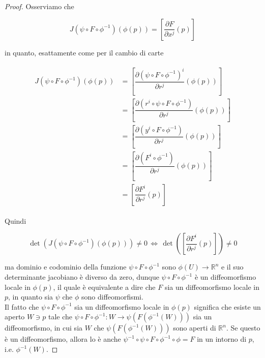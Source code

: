 \begin{proof}
	Osserviamo che
	
	\begin{equation}
		J(\psi \circ F \circ \phi^{-1})(\phi(p)) = \left[ \dfrac{\partial F}{\partial x^{j}} (p) \right]
	\end{equation}

	in quanto, esattamente come per il cambio di carte
	
	\begin{align}
		\begin{split}
			J(\psi \circ F \circ \phi^{-1})(\phi(p)) &= \left[ \dfrac{\partial (\psi \circ F \circ \phi^{-1})^{i}}{\partial r^{j}} (\phi(p)) \right]\\
			&= \left[ \dfrac{\partial (r^{i} \circ \psi \circ F \circ \phi^{-1})}{\partial r^{j}} (\phi(p)) \right]\\
			&= \left[ \dfrac{\partial (y^{i} \circ F \circ \phi^{-1})}{\partial r^{j}} (\phi(p)) \right]\\
			&= \left[ \dfrac{\partial (F^{i} \circ \phi^{-1})}{\partial r^{j}} (\phi(p)) \right]\\
			&= \left[ \dfrac{\partial F^{i}}{\partial r^{j}} (p) \right]
		\end{split}
	\end{align}

	Quindi
	
	\begin{equation}
		\det( J(\psi \circ F \circ \phi^{-1})(\phi(p)) ) \neq 0 \, \iff \, \det( \left[ \dfrac{\partial F^{i}}{\partial r^{j}} (p) \right] ) \neq 0
	\end{equation}

	ma dominio e codominio della funzione $ \psi \circ F \circ \phi^{-1} $ sono $ \phi(U) \to \mathbb{R}^{n} $ e il suo determinante jacobiano è diverso da zero, dunque $ \psi \circ F \circ \phi^{-1} $ è un diffeomorfismo locale in $ \phi(p) $, il quale è equivalente a dire che $ F $ sia un diffeomorfismo locale in $ p $, in quanto sia $ \psi $ che $ \phi $ sono diffeomorfismi.\\
	Il fatto che $ \psi \circ F \circ \phi^{-1} $ sia un diffeomorfismo locale in $ \phi(p) $ significa che esiste un aperto $ W \ni p $ tale che $ \psi \circ F \circ \phi^{-1} : W \to \psi(F(\phi^{-1}(W))) $ sia un diffeomorfismo, in cui sia $ W $ che $ \psi(F(\phi^{-1}(W))) $ sono aperti di $ \mathbb{R}^{n} $. Se questo è un diffeomorfismo, allora lo è anche $ \psi^{-1} \circ \psi \circ F \circ \phi^{-1} \circ \phi = F $ in un intorno di $ p $, i.e. $ \phi^{-1}(W) $.
\end{proof}

